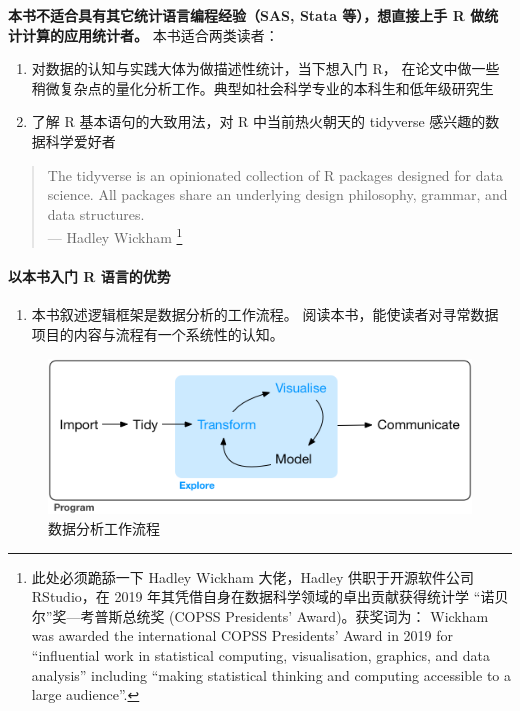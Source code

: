 \documentclass[11pt,hyperref]{ctexart}
\providecommand{\tightlist}{%
  \setlength{\itemsep}{0pt}\setlength{\parskip}{0pt}}
\let\oldparagraph\paragraph
\renewcommand{\paragraph}[1]{\oldparagraph{#1}\mbox{}}
\begin{document}
\textbf{本书不适合具有其它统计语言编程经验（SAS, Stata 等），想直接上手
R 做统计计算的应用统计者。} 本书适合两类读者：

\begin{enumerate}
\def\labelenumi{\arabic{enumi}.}
\item
  对数据的认知与实践大体为做描述性统计，当下想入门 R，
  在论文中做一些稍微复杂点的量化分析工作。典型如社会科学专业的本科生和低年级研究生
\item
  了解 R 基本语句的大致用法，对 R 中当前热火朝天的 tidyverse
  感兴趣的数据科学爱好者
\end{enumerate}

\begin{quote}
The tidyverse is an opinionated collection of R packages designed for
data science. All packages share an underlying design philosophy,
grammar, and data structures.\\
--- Hadley Wickham \footnote{此处必须跪舔一下 Hadley Wickham
  大佬，Hadley 供职于开源软件公司 RStudio，在 2019
  年其凭借自身在数据科学领域的卓出贡献获得统计学
  ``诺贝尔''奖---考普斯总统奖 (COPSS Presidents' Award)。获奖词为：
  Wickham was awarded the international COPSS Presidents' Award in 2019
  for ``influential work in statistical computing, visualisation,
  graphics, and data analysis'' including ``making statistical thinking
  and computing accessible to a large audience''.}
\end{quote}

\hypertarget{ux4ee5ux672cux4e66ux5165ux95e8-r-ux8bedux8a00ux7684ux4f18ux52bf}{%
\paragraph{以本书入门 R
语言的优势}\label{ux4ee5ux672cux4e66ux5165ux95e8-r-ux8bedux8a00ux7684ux4f18ux52bf}}

\begin{enumerate}
\def\labelenumi{\arabic{enumi}.}
\tightlist
\item
  本书叙述逻辑框架是数据分析的工作流程。
  阅读本书，能使读者对寻常数据项目的内容与流程有一个系统性的认知。
\end{enumerate}

\begin{figure}
\centering
\includegraphics{images/data-science-explore.png}
\caption{数据分析工作流程}
\end{figure}
\end{document}
